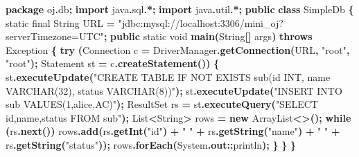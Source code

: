 \documentclass[
  11pt,
]{ctexart}
\newenvironment{Shaded}{\begin{snugshade}}{\end{snugshade}}
\newcommand{\BuiltInTok}[1]{#1}
\newcommand{\ControlFlowTok}[1]{\textcolor[rgb]{0.13,0.29,0.53}{\textbf{#1}}}
\newcommand{\DataTypeTok}[1]{\textcolor[rgb]{0.13,0.29,0.53}{#1}}
\newcommand{\FunctionTok}[1]{\textcolor[rgb]{0.13,0.29,0.53}{\textbf{#1}}}
\newcommand{\ImportTok}[1]{#1}
\newcommand{\KeywordTok}[1]{\textcolor[rgb]{0.13,0.29,0.53}{\textbf{#1}}}
\newcommand{\NormalTok}[1]{#1}
\newcommand{\OperatorTok}[1]{\textcolor[rgb]{0.81,0.36,0.00}{\textbf{#1}}}
\newcommand{\StringTok}[1]{\textcolor[rgb]{0.31,0.60,0.02}{#1}}
\begin{document}
\begin{Shaded}
\begin{Highlighting}[]
\KeywordTok{package}\ImportTok{ oj}\OperatorTok{.}\ImportTok{db}\OperatorTok{;}
\KeywordTok{import} \ImportTok{java}\OperatorTok{.}\ImportTok{sql}\OperatorTok{.*;}
\KeywordTok{import} \ImportTok{java}\OperatorTok{.}\ImportTok{util}\OperatorTok{.*;}
\KeywordTok{public} \KeywordTok{class}\NormalTok{ SimpleDb }\OperatorTok{\{}
    \DataTypeTok{static} \DataTypeTok{final} \BuiltInTok{String} \BuiltInTok{URL} \OperatorTok{=} \StringTok{"jdbc:mysql://localhost:3306/mini\_oj?serverTimezone=UTC"}\OperatorTok{;}
    \KeywordTok{public} \DataTypeTok{static} \DataTypeTok{void} \FunctionTok{main}\OperatorTok{(}\BuiltInTok{String}\OperatorTok{[]}\NormalTok{ args}\OperatorTok{)} \KeywordTok{throws} \BuiltInTok{Exception} \OperatorTok{\{}
        \ControlFlowTok{try} \OperatorTok{(}\BuiltInTok{Connection}\NormalTok{ c }\OperatorTok{=} \BuiltInTok{DriverManager}\OperatorTok{.}\FunctionTok{getConnection}\OperatorTok{(}\BuiltInTok{URL}\OperatorTok{,} \StringTok{"root"}\OperatorTok{,} \StringTok{"root"}\OperatorTok{);}
             \BuiltInTok{Statement}\NormalTok{ st }\OperatorTok{=}\NormalTok{ c}\OperatorTok{.}\FunctionTok{createStatement}\OperatorTok{())} \OperatorTok{\{}
\NormalTok{            st}\OperatorTok{.}\FunctionTok{executeUpdate}\OperatorTok{(}\StringTok{"CREATE TABLE IF NOT EXISTS sub(id INT, name VARCHAR(32), status VARCHAR(8))"}\OperatorTok{);}
\NormalTok{            st}\OperatorTok{.}\FunctionTok{executeUpdate}\OperatorTok{(}\StringTok{"INSERT INTO sub VALUES(1,\textquotesingle{}alice\textquotesingle{},\textquotesingle{}AC\textquotesingle{})"}\OperatorTok{);}
            \BuiltInTok{ResultSet}\NormalTok{ rs }\OperatorTok{=}\NormalTok{ st}\OperatorTok{.}\FunctionTok{executeQuery}\OperatorTok{(}\StringTok{"SELECT id,name,status FROM sub"}\OperatorTok{);}
            \BuiltInTok{List}\OperatorTok{\textless{}}\BuiltInTok{String}\OperatorTok{\textgreater{}}\NormalTok{ rows }\OperatorTok{=} \KeywordTok{new} \BuiltInTok{ArrayList}\OperatorTok{\textless{}\textgreater{}();}
            \ControlFlowTok{while} \OperatorTok{(}\NormalTok{rs}\OperatorTok{.}\FunctionTok{next}\OperatorTok{())}\NormalTok{ rows}\OperatorTok{.}\FunctionTok{add}\OperatorTok{(}\NormalTok{rs}\OperatorTok{.}\FunctionTok{getInt}\OperatorTok{(}\StringTok{"id"}\OperatorTok{)} \OperatorTok{+} \StringTok{" "} \OperatorTok{+}\NormalTok{ rs}\OperatorTok{.}\FunctionTok{getString}\OperatorTok{(}\StringTok{"name"}\OperatorTok{)} \OperatorTok{+} \StringTok{" "} \OperatorTok{+}\NormalTok{ rs}\OperatorTok{.}\FunctionTok{getString}\OperatorTok{(}\StringTok{"status"}\OperatorTok{));}
\NormalTok{            rows}\OperatorTok{.}\FunctionTok{forEach}\OperatorTok{(}\BuiltInTok{System}\OperatorTok{.}\FunctionTok{out}\OperatorTok{::}\NormalTok{println}\OperatorTok{);}
        \OperatorTok{\}}
    \OperatorTok{\}}
\OperatorTok{\}}
\end{Highlighting}
\end{Shaded}
\end{document}
